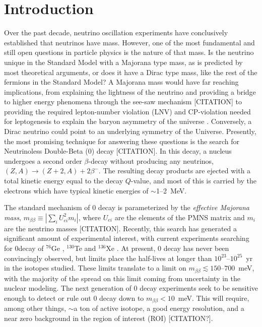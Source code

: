 \section{Introduction}

Over the past decade, neutrino oscillation experiments have
conclusively established that neutrinos have mass. However, one of the
most fundamental and still open questions in particle physics is the
nature of that mass. Is the neutrino unique in the Standard Model with
a Majorana type mass, as is predicted by most theoretical arguments,
or does it have a Dirac type mass, like the rest of the fermions in
the Standard Model? A Majorana mass would have far reaching
implications, from explaining the lightness of the neutrino and
providing a bridge to higher energy phenomena through the see-saw
mechanism [CITATION] to providing the required lepton-number violation
(LNV) and {\sf CP}-violation needed for leptogenesis to explain the
baryon asymmetry of the universe \cite{Luty1992}. Conversely, a Dirac
neutrino could point to an underlying symmetry of the Universe.
Presently, the most promising technique for answering these questions
is the search for Neutrinoless Double-Beta (0\nbb) decay
[CITATION]. In this decay, a nucleus undergoes a second order
$\beta$-decay without producing any neutrinos,
$(Z,A)\rightarrow(Z+2,A)+2\beta^-$. The resulting decay products are
ejected with a total kinetic energy equal to the decay $Q$-value, and
most of this is carried by the electrons which have typical kinetic
energies of $\sim$1--2~MeV.

The standard mechanism of 0{\nbb} decay is parameterized by the
\emph{effective Majorana mass},
\mbox{$m_{\beta\beta}\equiv\left|\sum_i U^2_{ei}m_i\right|$}, where
$U_{ei}$ are the elements of the PMNS matrix and $m_i$ are the
neutrino masses [CITATION].  Recently, this search has generated a
significant amount of experimental interest, with current experiments
searching for 0\nbb decay of $^{76}$Ge \cite{GERDA2013}, $^{130}$Te
\cite{CUORE2015} and $^{136}$Xe \cite{EXO2014,KamLANDZen2013}. At
present, 0{\nbb} decay has never been convincingly observed, but
limits place the half-lives at longer than $10^{23}$--$10^{25}$~yr in
the isotopes studied. These limits translate to a limit on
\mbox{$m_{\beta\beta}\lesssim 150$--$700$~meV}, with the majority of
the spread on this limit coming from uncertainty in the nuclear
modeling. The next generation of 0{\nbb} decay experiments seek to be
sensitive enough to detect or rule out 0{\nbb} decay down to
\mbox{$m_{\beta\beta}<10$~meV}. This will require, among other things,
$\sim$a ton of active isotope, a good energy resolution, and a near
zero background in the region of interest (ROI) [CITATION?].

